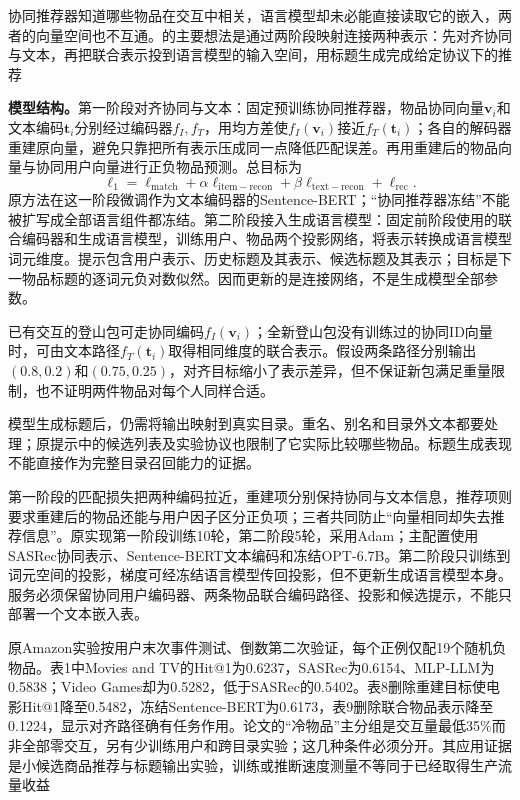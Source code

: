 协同推荐器知道哪些物品在交互中相关，语言模型却未必能直接读取它的嵌入，两者的向量空间也不互通。的主要想法是通过两阶段映射连接两种表示：先对齐协同与文本，再把联合表示投到语言模型的输入空间，用标题生成完成给定协议下的推荐

\textbf{模型结构。}第一阶段对齐协同与文本：固定预训练协同推荐器，物品协同向量$\bm{v}_i$和文本编码$\bm{t}_i$分别经过编码器$f_I,f_T$，用均方差使$f_I(\bm{v}_i)$接近$f_T(\bm{t}_i)$；各自的解码器重建原向量，避免只靠把所有表示压成同一点降低匹配误差。再用重建后的物品向量与协同用户向量进行正负物品预测。总目标为
\begin{equation}
  \ell_1=\ell_{\mathrm{match}}
      +\alpha\ell_{\mathrm{item-recon}}
      +\beta\ell_{\mathrm{text-recon}}+\ell_{\mathrm{rec}}.
  \label{eq:rs-a-llmrec-stage1}
\end{equation}
原方法在这一阶段微调作为文本编码器的Sentence-BERT；“协同推荐器冻结”不能被扩写成全部语言组件都冻结。第二阶段接入生成语言模型：固定前阶段使用的联合编码器和生成语言模型，训练用户、物品两个投影网络，将表示转换成语言模型词元维度。提示包含用户表示、历史标题及其表示、候选标题及其表示；目标是下一物品标题的逐词元负对数似然。因而更新的是连接网络，不是生成模型全部参数。

已有交互的登山包可走协同编码$f_I(\bm{v}_i)$；全新登山包没有训练过的协同ID向量时，可由文本路径$f_T(\bm{t}_i)$取得相同维度的联合表示。假设两条路径分别输出$(0.8,0.2)$和$(0.75,0.25)$，对齐目标缩小了表示差异，但不保证新包满足重量限制，也不证明两件物品对每个人同样合适。

模型生成标题后，仍需将输出映射到真实目录。重名、别名和目录外文本都要处理；原提示中的候选列表及实验协议也限制了它实际比较哪些物品。标题生成表现不能直接作为完整目录召回能力的证据。

第一阶段的匹配损失把两种编码拉近，重建项分别保持协同与文本信息，推荐项则要求重建后的物品还能与用户因子区分正负项；三者共同防止“向量相同却失去推荐信息”。原实现第一阶段训练10轮，第二阶段5轮，采用Adam；主配置使用SASRec协同表示、Sentence-BERT文本编码和冻结OPT-6.7B。第二阶段只训练到词元空间的投影，梯度可经冻结语言模型传回投影，但不更新生成语言模型本身。服务必须保留协同用户编码器、两条物品联合编码路径、投影和候选提示，不能只部署一个文本嵌入表。

原Amazon实验按用户末次事件测试、倒数第二次验证，每个正例仅配19个随机负物品。表1中Movies and TV的Hit@1为0.6237，SASRec为0.6154、MLP-LLM为0.5838；Video Games却为0.5282，低于SASRec的0.5402。表8删除重建目标使电影Hit@1降至0.5482，冻结Sentence-BERT为0.6173，表9删除联合物品表示降至0.1224，显示对齐路径确有任务作用。论文的“冷物品”主分组是交互量最低35\%而非全部零交互，另有少训练用户和跨目录实验；这几种条件必须分开。其应用证据是小候选商品推荐与标题输出实验，训练或推断速度测量不等同于已经取得生产流量收益

